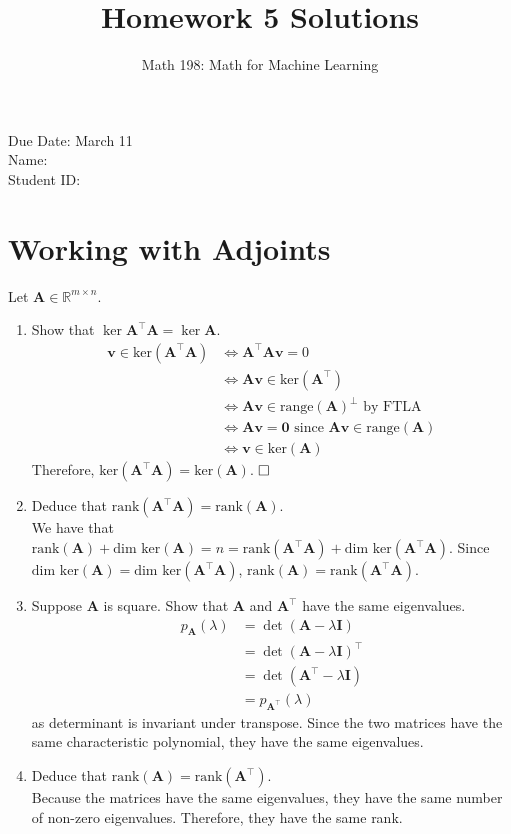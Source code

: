 \documentclass{article}
\title{Homework 5 Solutions}
\author{Math 198: Math for Machine Learning}
\date{}
\begin{document}
\maketitle

\noindent
Due Date: March 11 \\
Name: \\
Student ID:

\section{Working with Adjoints}
Let $\textbf{A} \in \mathbb{R}^{m \times n}$.
\begin{enumerate}[label=(\alph*)]
\item Show that $\ker \textbf{A}^\top \textbf{A} = \ker \textbf{A}$. \\
{\color{blue} \begin{align*}
\mathbf{v} \in \text{ker}(\mathbf{A^{\top}A}) &\iff \mathbf{A^{\top}Av} = 0 \\
&\iff \mathbf{Av} \in \text{ker}(\mathbf{A^{\top}})\\
&\iff \mathbf{Av} \in \text{range}(\mathbf{A})^{\perp} \text{ by FTLA} \\
&\iff \mathbf{Av = 0} \text{ since } \mathbf{Av} \in \text{range}(\mathbf{A}) \\
&\iff \mathbf{v} \in \text{ker}(\mathbf{A})
\end{align*} Therefore, $\text{ker}(\mathbf{A^{\top}A}) = \text{ker}(\mathbf{A})$. $\hfill\square$}
\item Deduce that $\text{rank}( \textbf{A}^\top \textbf{A}) = \text{rank}(\textbf{A})$. \\
{\color{blue} We have that $\text{rank}(\mathbf{A}) + \text{dim ker}(\mathbf{A}) = n = \text{rank}(\mathbf{A^{\top}A}) + \text{dim ker}(\mathbf{A^{\top}A})$. Since $\text{dim ker}(\mathbf{A}) = \text{dim ker}(\mathbf{A^\top A})$, $\text{rank}(\mathbf{A}) = \text{rank}(\mathbf{A^{\top}A})$.}
\item Suppose $\mathbf{A}$ is square. Show that $\textbf{A}$ and $\textbf{A}^\top$ have the same eigenvalues. \\
{\color{blue} \begin{align*} 
p_{\mathbf{A}}(\lambda) &= \det (\mathbf{A} - \lambda\mathbf{I}) \\
&= \det(\mathbf{A} - \lambda\mathbf{I})^{\top} \\
&= \det(\mathbf{A^{\top}} - \lambda\mathbf{I}) \\
&= p_{\mathbf{A^{\top}}}(\lambda)
\end{align*} as determinant is invariant under transpose. Since the two matrices have the same characteristic polynomial, they have the same eigenvalues.}
\item Deduce that $\text{rank}(\textbf{A}) = \text{rank}(\textbf{A}^\top)$. \\
{\color{blue} Because the matrices have the same eigenvalues, they have the same number of non-zero eigenvalues. Therefore, they have the same rank.}
\end{enumerate}
\end{document}
